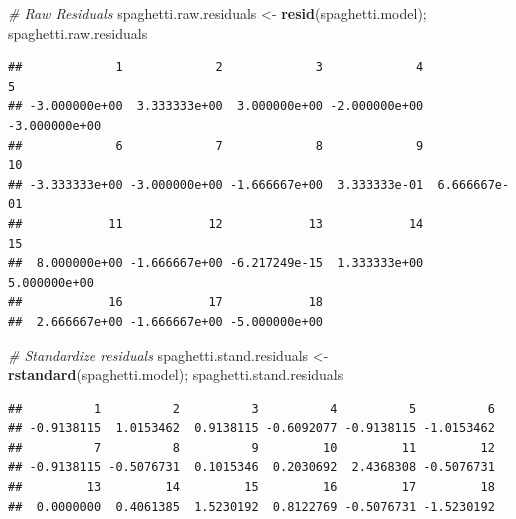 \documentclass[12pt,]{article}
\newenvironment{Shaded}{\begin{snugshade}}{\end{snugshade}}
\newcommand{\KeywordTok}[1]{\textcolor[rgb]{0.13,0.29,0.53}{\textbf{#1}}}
\newcommand{\StringTok}[1]{\textcolor[rgb]{0.31,0.60,0.02}{#1}}
\newcommand{\CommentTok}[1]{\textcolor[rgb]{0.56,0.35,0.01}{\textit{#1}}}
\newcommand{\NormalTok}[1]{#1}
\begin{document}
\begin{Shaded}
\begin{Highlighting}[]
\CommentTok{# Raw Residuals}
\NormalTok{spaghetti.raw.residuals <-}\StringTok{ }\KeywordTok{resid}\NormalTok{(spaghetti.model); spaghetti.raw.residuals}
\end{Highlighting}
\end{Shaded}

\begin{verbatim}
##             1             2             3             4             5 
## -3.000000e+00  3.333333e+00  3.000000e+00 -2.000000e+00 -3.000000e+00 
##             6             7             8             9            10 
## -3.333333e+00 -3.000000e+00 -1.666667e+00  3.333333e-01  6.666667e-01 
##            11            12            13            14            15 
##  8.000000e+00 -1.666667e+00 -6.217249e-15  1.333333e+00  5.000000e+00 
##            16            17            18 
##  2.666667e+00 -1.666667e+00 -5.000000e+00
\end{verbatim}

\begin{Shaded}
\begin{Highlighting}[]
\CommentTok{# Standardize residuals }
\NormalTok{spaghetti.stand.residuals <-}\StringTok{ }\KeywordTok{rstandard}\NormalTok{(spaghetti.model); spaghetti.stand.residuals }
\end{Highlighting}
\end{Shaded}

\begin{verbatim}
##          1          2          3          4          5          6 
## -0.9138115  1.0153462  0.9138115 -0.6092077 -0.9138115 -1.0153462 
##          7          8          9         10         11         12 
## -0.9138115 -0.5076731  0.1015346  0.2030692  2.4368308 -0.5076731 
##         13         14         15         16         17         18 
##  0.0000000  0.4061385  1.5230192  0.8122769 -0.5076731 -1.5230192
\end{verbatim}
\end{document}

